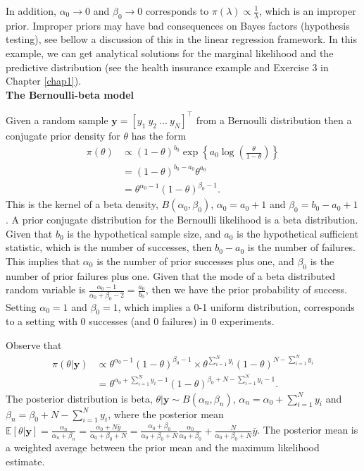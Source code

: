 \begin{enumerate}
In addition, $\alpha_0\rightarrow 0$ and $\beta_0\rightarrow 0$ corresponds to $\pi(\lambda)\propto \frac{1}{\lambda}$, which is an improper prior. Improper priors may have bad consequences on Bayes factors (hypothesis testing), see bellow a discussion of this in the linear regression framework. In this example, we can get analytical solutions for the marginal likelihood and the predictive distribution (see the health insurance example and Exercise 3 in Chapter \ref{chap1}).\\ 

\textbf{The Bernoulli-beta model}

Given a random sample $\bm{y}=[y_1 \ y_2 \ \dots \ y_N]^{\top}$ from a Bernoulli distribution then a conjugate prior density for $\theta$ has the form 
\begin{align}
	\pi(\theta)&\propto (1-\theta)^{b_0} \exp\left\{a_0\log\left(\frac{\theta}{1-\theta}\right)\right\}\nonumber\\
	& = (1-\theta)^{b_0-a_0}\theta^{a_0}\nonumber\\
	& = \theta^{\alpha_0-1}(1-\theta)^{\beta_0-1}.\nonumber
\end{align}
This is the kernel of a beta density, $B(\alpha_0,\beta_0)$, $\alpha_0=a_0+1$ and $\beta_0=b_0-a_0+1$. A prior conjugate distribution for the Bernoulli likelihood is a beta distribution. Given that $b_0$ is the hypothetical sample size, and $a_0$ is the hypothetical sufficient statistic, which is the number of successes, then $b_0-a_0$ is the number of failures. This implies that $\alpha_0$ is the number of prior successes plus one, and $\beta_0$ is the number of prior failures plus one. Given that the mode of a beta distributed random variable is $\frac{\alpha_0-1}{\alpha_0+\beta_0-2}=\frac{a_0}{b_0}$, then we have the prior probability of success. Setting $\alpha_0=1$ and $\beta_0=1$, which implies a 0-1 uniform distribution, corresponds to a setting with 0 successes (and 0 failures) in 0 experiments.   

Observe that
\begin{align}
	\pi(\theta|\bm{y})&\propto \theta^{\alpha_0-1}(1-\theta)^{\beta_0-1} \times \theta^{\sum_{i=1}^N y_i}(1-\theta)^{N-\sum_{i=1}^Ny_i}\nonumber\\
	&= \theta^{\alpha_0+\sum_{i=1}^N y_i-1}(1-\theta)^{\beta_0+N-\sum_{i=1}^Ny_i-1}.\nonumber 
\end{align}
The posterior distribution is beta, $\theta|\bm{y}\sim B(\alpha_n,\beta_n)$, $\alpha_n=\alpha_0+\sum_{i=1}^N y_i$ and $\beta_n=\beta_0+N-\sum_{i=1}^Ny_i$, where the posterior mean $\mathbb{E}[\theta|\bm{y}]=\frac{\alpha_n}{\alpha_n+\beta_n}=\frac{\alpha_0+N\bar{y}}{\alpha_0+\beta_0+N}=\frac{\alpha_0+\beta_0}{\alpha_0+\beta_0+N}\frac{\alpha_0}{\alpha_0+\beta_0}+\frac{N}{\alpha_0+\beta_0+N}\bar{y}$. The posterior mean is a weighted average between the prior mean and the maximum likelihood estimate.


\end{enumerate}
